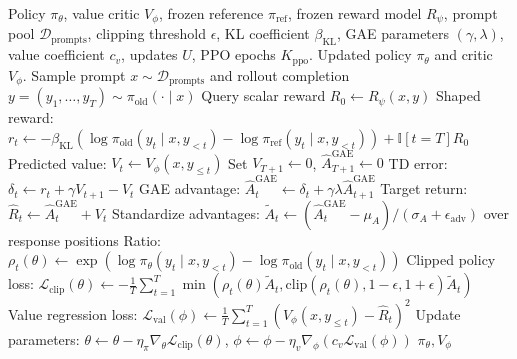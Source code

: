 \documentclass{article}
\begin{document}
\begin{algorithm}[H]
\caption{PPO Token-Level Continuation with GAE and Ratio Clipping}\label{alg:ppo}
\begin{algorithmic}[1]
\Require Policy $\pi_\theta$, value critic $V_\phi$, frozen reference $\pi_{\text{ref}}$, frozen reward model $R_\psi$, prompt pool $\mathcal{D}_{\text{prompts}}$, clipping threshold $\epsilon$, KL coefficient $\beta_{\text{KL}}$, GAE parameters $(\gamma, \lambda)$, value coefficient $c_v$, updates $U$, PPO epochs $K_{\text{ppo}}$.
\Ensure Updated policy $\pi_\theta$ and critic $V_\phi$.
  \State Sample prompt $x \sim \mathcal{D}_{\text{prompts}}$ and rollout completion $y = (y_1, \dots, y_T) \sim \pi_{\text{old}}(\cdot \mid x)$
  \State Query scalar reward $R_0 \gets R_\psi(x, y)$
    \State Shaped reward: $r_t \gets -\beta_{\text{KL}} \left(\log \pi_{\text{old}}(y_t \mid x, y_{<t}) - \log \pi_{\text{ref}}(y_t \mid x, y_{<t})\right) + \mathbb{I}[t = T] R_0$
    \State Predicted value: $V_t \gets V_\phi(x, y_{\le t})$
  \EndFor
  \State Set $V_{T+1} \gets 0$, $\hat{A}_{T+1}^{\text{GAE}} \gets 0$
   
    \State TD error: $\delta_t \gets r_t + \gamma V_{t+1} - V_t$
    \State GAE advantage: $\hat{A}_t^{\text{GAE}} \gets \delta_t + \gamma \lambda \hat{A}_{t+1}^{\text{GAE}}$
    \State Target return: $\hat{R}_t \gets \hat{A}_t^{\text{GAE}} + V_t$
  \EndFor
  \State Standardize advantages: $\tilde{A}_t \gets (\hat{A}_t^{\text{GAE}} - \mu_A) / (\sigma_A + \epsilon_{\text{adv}})$ over response positions
    \State Ratio: $\rho_t(\theta) \gets \exp\left(\log \pi_\theta(y_t \mid x, y_{<t}) - \log \pi_{\text{old}}(y_t \mid x, y_{<t})\right)$
    \State Clipped policy loss: $\mathcal{L}_{\text{clip}}(\theta) \gets - \frac{1}{T} \sum_{t=1}^T \min\left( \rho_t(\theta)\tilde{A}_t, \text{clip}(\rho_t(\theta), 1-\epsilon, 1+\epsilon)\tilde{A}_t \right)$
    \State Value regression loss: $\mathcal{L}_{\text{val}}(\phi) \gets \frac{1}{T} \sum_{t=1}^T (V_\phi(x, y_{\le t}) - \hat{R}_t)^2$
    \State Update parameters: $\theta \gets \theta - \eta_\pi \nabla_\theta \mathcal{L}_{\text{clip}}(\theta)$, $\phi \gets \phi - \eta_v \nabla_\phi (c_v \mathcal{L}_{\text{val}}(\phi))$
  \EndFor
\EndFor
\State \Return $\pi_\theta, V_\phi$
\end{algorithmic}
\end{algorithm}

\clearpage
\end{document}
